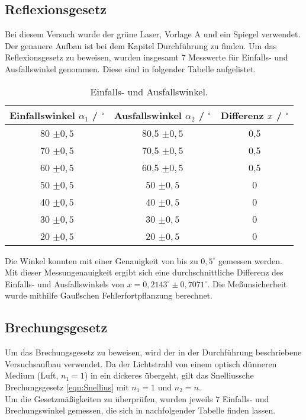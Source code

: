 \subsection{Reflexionsgesetz}
Bei diesem Versuch wurde der grüne Laser, Vorlage A und ein Spiegel verwendet. Der genauere Aufbau ist bei dem Kapitel Durchführung zu finden.
Um das Reflexionsgesetz zu beweisen, wurden insgesamt 7 Messwerte für Einfalls- und Ausfallswinkel genommen. Diese sind in folgender Tabelle
aufgelistet.
\begin{table}
  \centering
  \caption{Einfalls- und Ausfallswinkel.}
  \label{tab:Aufgabe1}
  \begin{tabular}{c c c}
    \toprule
    Einfallswinkel $\alpha_1$ / $^{\circ}$& Ausfallswinkel $\alpha_2$ / $^{\circ}$ & Differenz $x$ / $^{\circ}$\\
    \midrule
    80 $\pm 0,5$ & 80,5 $\pm 0,5$ & 0,5 \\
    70 $\pm 0,5$& 70,5 $\pm 0,5$& 0,5\\
    60  $\pm 0,5$&60,5 $\pm 0,5$& 0,5\\
    50  $\pm 0,5$&50 $\pm 0,5$& 0\\
    40 $\pm 0,5$& 40 $\pm 0,5$& 0\\
    30 $\pm 0,5$& 30 $\pm 0,5$& 0\\
    20 $\pm 0,5$& 20 $\pm 0,5$& 0\\
    \bottomrule
  \end{tabular}
\end{table}
Die Winkel konnten mit einer Genauigkeit von bis zu $0,5^{\circ}$ gemessen werden. \\
Mit dieser Messungenauigkeit ergibt sich eine durchschnittliche Differenz des Einfalls- und
Ausfallswinkels von $x = 0,2143^{\circ} \pm 0,7071^{\circ}$. Die Meßunsicherheit wurde mithilfe Gaußschen Fehlerfortpflanzung berechnet.

\subsection{Brechungsgesetz}
Um das Brechungsgesetz zu beweisen, wird der in der Durchführung beschriebene Versuchsaufbau verwendet. Da der Lichtstrahl von einem optisch dünneren
Medium (Luft, $n_1=1$) in ein dickeres übergeht, gilt das Snelliussche Brechungsgesetz \autoref{eqn:Snellius} mit $n_1=1$ und $n_2=n$.\\
Um die Gesetzmäßigkeiten zu überprüfen, wurden jeweils 7 Einfalls- und Brechungswinkel gemessen, die sich in nachfolgender Tabelle finden lassen.

